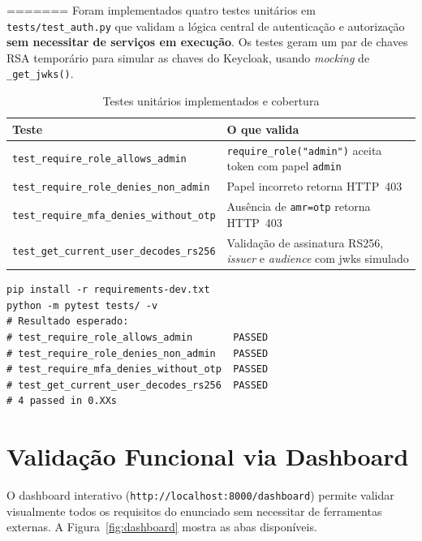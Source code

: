 \begin{table}[h!]
\centering
\caption{Verificação de cumprimento dos requisitos do enunciado}
=======
Foram implementados quatro testes unitários em \texttt{tests/test\_auth.py} que validam a lógica central de autenticação e autorização \textbf{sem necessitar de serviços em execução}. Os testes geram um par de chaves RSA temporário para simular as chaves do Keycloak, usando \textit{mocking} de \texttt{\_get\_jwks()}.

\begin{table}[h!]
\centering
\caption{Testes unitários implementados e cobertura}
\label{tab:testes}
\begin{tabularx}{\textwidth}{|l|X|}
\hline
\textbf{Teste} & \textbf{O que valida} \\ \hline
\texttt{test\_require\_role\_allows\_admin} & \texttt{require\_role("admin")} aceita token com papel \texttt{admin} \\ \hline
\texttt{test\_require\_role\_denies\_non\_admin} & Papel incorreto retorna HTTP~403 \\ \hline
\texttt{test\_require\_mfa\_denies\_without\_otp} & Ausência de \texttt{amr=otp} retorna HTTP~403 \\ \hline
\texttt{test\_get\_current\_user\_decodes\_rs256} & Validação de assinatura RS256, \textit{issuer} e \textit{audience} com \gls{jwks} simulado \\ \hline
\end{tabularx}
\end{table}

\begin{lstlisting}[caption={Execução dos testes unitários},label={lst:pytest}]
pip install -r requirements-dev.txt
python -m pytest tests/ -v
# Resultado esperado:
# test_require_role_allows_admin       PASSED
# test_require_role_denies_non_admin   PASSED
# test_require_mfa_denies_without_otp  PASSED
# test_get_current_user_decodes_rs256  PASSED
# 4 passed in 0.XXs
\end{lstlisting}

\section{Validação Funcional via Dashboard}

O dashboard interativo (\texttt{http://localhost:8000/dashboard}) permite validar visualmente todos os requisitos do enunciado sem necessitar de ferramentas externas. A Figura~\ref{fig:dashboard} mostra as abas disponíveis.


\end{table}
